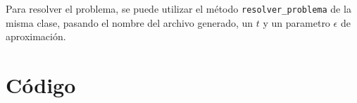 \documentclass[a4paper,10pt]{article}
\begin{document}
Para resolver el problema, se puede utilizar el método \texttt{resolver\_problema} de la misma clase, pasando el nombre del archivo generado, un $t$ y un parametro $\epsilon$ de aproximación.

\pagebreak

\newpage
\section{Código}
\lstset{
	language=Python, columns=flexible, breaklines=true, frame=single, title=creador\_grafos.py
}


\lstset{ title=grafo.py }


\lstset{ title=karger.py }


\lstset{ title=parser.py }


\lstset{ title=pg.py }


\lstset{ title=pg\_test.py }


\lstset{ title=subset\_sum.py }

\end{document}
